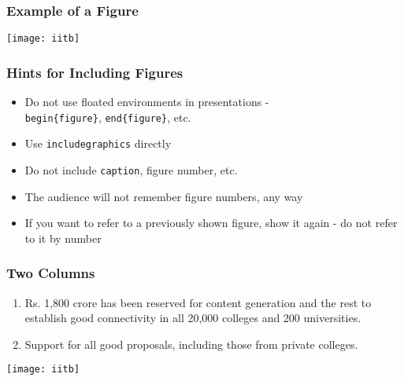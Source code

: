 \documentclass[handout]{beamer}
\begin{document}
\begin{frame}
\frametitle{Example of a Figure}
\begin{center}
\texttt{[image: iitb]}
\end{center}
\end{frame}

\begin{frame}
\frametitle{Hints for Including Figures}
\begin{itemize}
\item<+-> Do not use floated environments in
  presentations 
  - \\ {\tt begin\{figure\}}, {\tt end\{figure\}}, 
  etc. 
\item<+-> Use {\tt includegraphics} directly
\item<+-> Do not include {\tt caption}, figure
  number, etc.
\item<+-> The audience will not remember figure
  numbers, any way
\item<+-> If you want to refer to a previously
  shown figure, show it again - do not refer to it
  by number
\end{itemize}
\end{frame}

\begin{frame}
\frametitle{Two Columns}
\begin{minipage}[c]{0.45\textwidth}
\begin{enumerate}
\item<+-|alert@+> Rs. 1,800 crore has been reserved for
  content generation and the rest to establish good
  connectivity in all 20,000 colleges and 200
  universities.
\item<+-|alert@+> Support for all good proposals,
  including those from private colleges.
\end{enumerate}
\end{minipage} \pause
\hfill
\begin{minipage}[c]{0.45\textwidth}
\texttt{[image: iitb]}
\end{minipage}
\end{frame}
\end{document}
